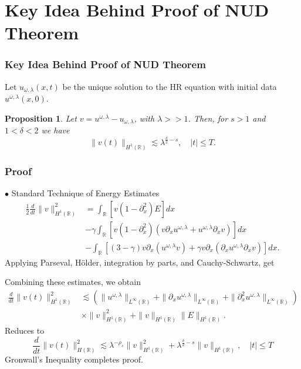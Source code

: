 \documentclass{beamer}
\newcommand{\rr}{\mathbb{R}}
\newcommand{\p}{\partial}
\newtheorem{proposition}{Proposition}
\begin{document}
\section{Key Idea Behind Proof of NUD Theorem}
\begin{frame}
	\frametitle{Key Idea Behind Proof of NUD Theorem}
Let
$u_{\omega,\lambda}(x,t)$ be the unique solution to the HR equation
with initial data $u^{\omega,\lambda}(x,0)$. %
%
%
\begin{proposition}
\label{applelem:bound_for_difference-of-approx-and-actual-soln}
%
Let $v = u^{\omega,\lambda} - u_{\omega,\lambda}$, with $\lambda >>1$.
Then, for $s > 1$ and $1<\delta<2$ we have
%
%
\begin{equation*} \|
v(t)
\|_{H^1(\rr)}
\lesssim \lambda^{\frac{\delta}{2} -s}, \quad
|t| \le T.
\end{equation*}
%
%
\end{proposition}
%
\end{frame}
\begin{frame}
%
\frametitle{Proof}
%
$\bullet$ Standard Technique of Energy Estimates
%
\begin{equation*}
\label{appleenergy-est}
\begin{split}
\frac{1}{2} \frac{d}{dt} \|v\|_{H^1(\rr)}^2  
& = 
 \int_{\rr} \left[ v(1-\p_x^2)E \right]dx\\
 &-
 \gamma \int_{\rr} \left[ v(1-\p_x^2)(v\p_x u^{\omega,\lambda} + 
u^{\omega,\lambda} \p_x v) \right]dx
\\
&- \int_{\rr}\left[ \left( 3-\gamma \right)v \p_x\left( u^{\omega,\lambda}v 
\right) + \gamma v
\p_x \left( \p_x u^{\omega,\lambda} \p_x v \right)\right]dx.
\end{split}
\end{equation*}
%
Applying Parseval, H\"older, integration by parts, and Cauchy-Schwartz, get
\end{frame}
\begin{frame}
Combining these estimates, we 
obtain
%
%
\begin{equation*}
\begin{split}
\label{appleenergy-estimate-best}
\frac{d}{dt} \|v(t)\|_{H^1(\rr)}^2
& \lesssim \left( \|u^{\omega,\lambda}\|_{L^\infty(\rr)} + \|
\p_x u^{\omega,\lambda} \|_{L^\infty(\rr)} + \|\p_x^2 u^{\omega,\lambda} 
\|_{L^\infty (\rr)} \right)
\\
& \times \|v\|_{H^1(\rr)}^2 + \|v\|_{H^1(\rr)} \|E\|_{H^1(\rr)}.
\end{split}
\end{equation*}
%
\pause
Reduces to
%
%
\begin{equation*}
\label{apple58}
\frac{d}{dt} \|v(t)\|_{H(\rr)}^2 \lesssim \lambda^{-\rho_s}
\|v\|_{H^1(\rr)}^2 + \lambda^{\frac{\delta}{2} -s}
\|v \|_{H^1(\rr)}, \quad |t| \le T
\end{equation*}
%
%
Gronwall's Inequality completes proof. 
%
%
\end{frame}
\end{document}
